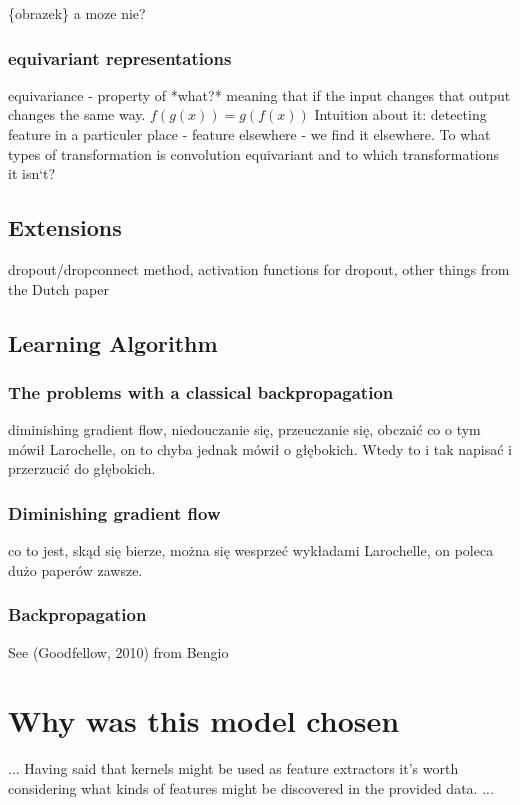 \documentclass[a4paper,10pt]{report}
\begin{document}
	  \{obrazek\} a moze nie?
	  
	\subsubsection{equivariant representations} %
	  equivariance - property of *what?* meaning that if the input changes that output changes the same way. $f(g(x)) = g(f(x))$ Intuition about it: detecting feature in a particuler place - feature elsewhere - we find it elsewhere. To what types of transformation is convolution equivariant and to which transformations it isn`t?\\
	  
	  \subsection{Extensions} %
	dropout/dropconnect method, activation functions for dropout, other things from the Dutch paper\\
	
	\subsection{Learning Algorithm} %
	
	
	\subsubsection{The problems with a classical backpropagation} %
	  diminishing gradient flow, niedouczanie się, przeuczanie się, obczaić co o tym mówił Larochelle, on to chyba jednak mówił o głębokich. Wtedy to i tak napisać i przerzucić do głębokich.\\
	
	\subsubsection{Diminishing gradient flow} %
	  co to jest, skąd się bierze, można się wesprzeć wykładami Larochelle, on poleca dużo paperów zawsze.\\
	  
	\subsubsection{Backpropagation} %
	  See (Goodfellow, 2010) from Bengio\\
	
	
	    \section{Why was this model chosen}
	... Having said that kernels might be used as feature extractors it's worth considering what kinds of features might be discovered in the provided data. ...\\
	

    
\end{document}
